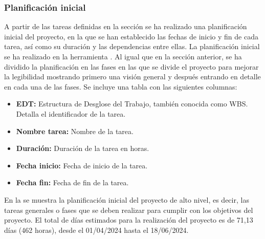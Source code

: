 \subsubsection{Planificación inicial} \label{sec:5-Planificacion-inicial}
\hypertarget{sec:5-Planificacion-inicial}{}
A partir de las tareas definidas en la sección  se ha realizado una planificación inicial del proyecto, en la que se han establecido las fechas de inicio y fin de cada tarea, así como su duración y las dependencias entre ellas. 
La planificación inicial se ha realizado en la herramienta .
Al igual que en la sección anterior, se ha dividido la planificación en las fases en las que se divide el proyecto para mejorar la legibilidad mostrando primero una visión general y después entrando en detalle en cada una de las fases.
Se incluye una tabla con las siguientes columnas:
\begin{itemize}
    \item \textbf{EDT:} Estructura de Desglose del Trabajo, también conocida como WBS. Detalla el identificador de la tarea.
    \item \textbf{Nombre tarea:} Nombre de la tarea.
    \item \textbf{Duración:} Duración de la tarea en horas.
    \item \textbf{Fecha inicio:} Fecha de inicio de la tarea.
    \item \textbf{Fecha fin:} Fecha de fin de la tarea.
\end{itemize}

En la  se muestra la planificación inicial del proyecto de alto nivel, es decir, las tareas generales o fases que se deben realizar para cumplir con los objetivos del proyecto.
El total de días estimados para la realización del proyecto es de 71,13 días (462 horas), desde el 01/04/2024 hasta el 18/06/2024.


